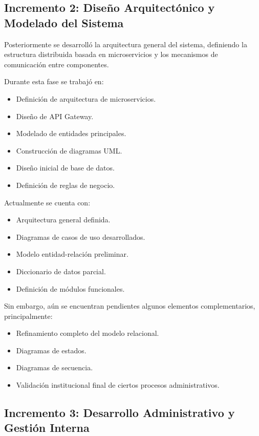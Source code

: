 \subsection{Incremento 2: Diseño Arquitectónico y Modelado del Sistema}

Posteriormente se desarrolló la arquitectura general del sistema, definiendo la estructura distribuida basada en microservicios y los mecanismos de comunicación entre componentes.

Durante esta fase se trabajó en:

\begin{itemize}
    \item Definición de arquitectura de microservicios.
    \item Diseño de API Gateway.
    \item Modelado de entidades principales.
    \item Construcción de diagramas UML.
    \item Diseño inicial de base de datos.
    \item Definición de reglas de negocio.
\end{itemize}

Actualmente se cuenta con:

\begin{itemize}
    \item Arquitectura general definida.
    \item Diagramas de casos de uso desarrollados.
    \item Modelo entidad-relación preliminar.
    \item Diccionario de datos parcial.
    \item Definición de módulos funcionales.
\end{itemize}

Sin embargo, aún se encuentran pendientes algunos elementos complementarios, principalmente:

\begin{itemize}
    \item Refinamiento completo del modelo relacional.
    \item Diagramas de estados.
    \item Diagramas de secuencia.
    \item Validación institucional final de ciertos procesos administrativos.
\end{itemize}

\subsection{Incremento 3: Desarrollo Administrativo y Gestión Interna}

